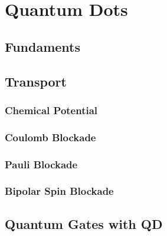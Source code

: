 
\chapter{Quantum Dots} %

\label{sec:Quantum_Dots} %


\section{Fundaments}


\section{Transport}

\subsection{Chemical Potential}

\subsection{Coulomb Blockade}

\subsection{Pauli Blockade}

\subsection{Bipolar Spin Blockade}

\section{Quantum Gates with QD}

